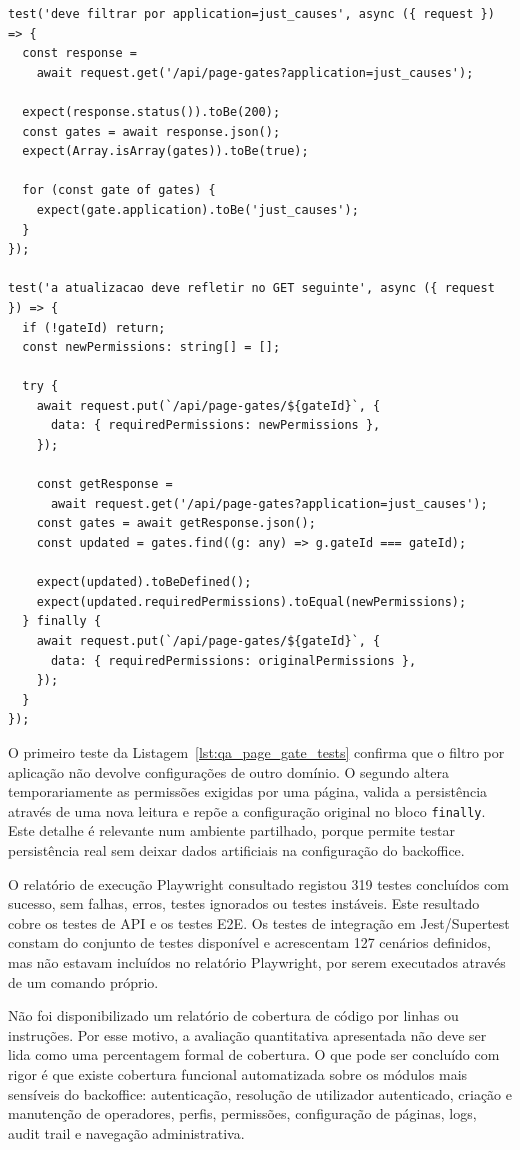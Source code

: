 \begin{lstlisting}[caption={Excerto de testes automatizados sobre configuração de acesso por página}, label={lst:qa_page_gate_tests}]
test('deve filtrar por application=just_causes', async ({ request }) => {
  const response =
    await request.get('/api/page-gates?application=just_causes');

  expect(response.status()).toBe(200);
  const gates = await response.json();
  expect(Array.isArray(gates)).toBe(true);

  for (const gate of gates) {
    expect(gate.application).toBe('just_causes');
  }
});

test('a atualizacao deve refletir no GET seguinte', async ({ request }) => {
  if (!gateId) return;
  const newPermissions: string[] = [];

  try {
    await request.put(`/api/page-gates/${gateId}`, {
      data: { requiredPermissions: newPermissions },
    });

    const getResponse =
      await request.get('/api/page-gates?application=just_causes');
    const gates = await getResponse.json();
    const updated = gates.find((g: any) => g.gateId === gateId);

    expect(updated).toBeDefined();
    expect(updated.requiredPermissions).toEqual(newPermissions);
  } finally {
    await request.put(`/api/page-gates/${gateId}`, {
      data: { requiredPermissions: originalPermissions },
    });
  }
});
\end{lstlisting}

O primeiro teste da Listagem~\ref{lst:qa_page_gate_tests} confirma que o filtro por aplicação não devolve configurações de outro domínio. O segundo altera temporariamente as permissões exigidas por uma página, valida a persistência através de uma nova leitura e repõe a configuração original no bloco \texttt{finally}. Este detalhe é relevante num ambiente partilhado, porque permite testar persistência real sem deixar dados artificiais na configuração do backoffice.

O relatório de execução Playwright consultado registou 319 testes concluídos com sucesso, sem falhas, erros, testes ignorados ou testes instáveis. Este resultado cobre os testes de \gls{API} e os testes \gls{E2E}. Os testes de integração em Jest/Supertest constam do conjunto de testes disponível e acrescentam 127 cenários definidos, mas não estavam incluídos no relatório Playwright, por serem executados através de um comando próprio.

Não foi disponibilizado um relatório de cobertura de código por linhas ou instruções. Por esse motivo, a avaliação quantitativa apresentada não deve ser lida como uma percentagem formal de cobertura. O que pode ser concluído com rigor é que existe cobertura funcional automatizada sobre os módulos mais sensíveis do backoffice: autenticação, resolução de utilizador autenticado, criação e manutenção de operadores, perfis, permissões, configuração de páginas, logs, audit trail e navegação administrativa.

